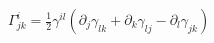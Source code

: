 $\Gamma^i_{jk} = \frac{1}{2} \gamma^{il} \left( \partial_j \gamma_{lk} + \partial_k \gamma_{lj} - \partial_l \gamma_{jk} \right)$
